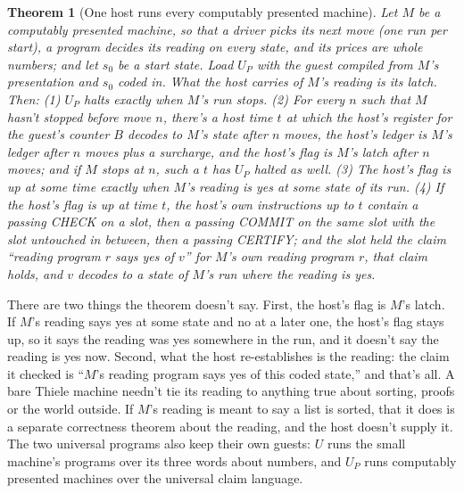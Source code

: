 \documentclass[11pt,twoside]{article}
\theoremstyle{thielethm}
\newtheorem{theorem}{Theorem}[section]
\theoremstyle{thieledef}
\theoremstyle{thieledef}
\theoremstyle{thieledef}
\theoremstyle{thielethm}
\theoremstyle{thieleobs}
\theoremstyle{thielethm}
\begin{document}
\begin{theorem}[One host runs every computably presented machine]\label{thm:u34-presented}
Let $M$ be a computably presented machine, so that a driver picks its next move (one run
per start), a program decides its reading on every state, and its prices are whole numbers; and let
$s_0$ be a start state. Load $U_P$ with the guest compiled from $M$'s presentation and $s_0$ coded
in. What the host carries of $M$'s reading is its latch. Then: (1) $U_P$ halts exactly when $M$'s run
stops. (2) For every $n$ such that $M$ hasn't stopped before move $n$, there's a host time $t$
at which the host's register for the guest's counter $B$ decodes to $M$'s state after $n$ moves,
the host's ledger is $M$'s ledger after $n$ moves plus a \emph{surcharge}, and the host's flag is
$M$'s latch after $n$ moves; and if $M$ stops at $n$, such a $t$ has $U_P$ halted as well. (3) The
host's flag is up at some time exactly when $M$'s reading is yes at some state of its run. (4) If
the host's flag is up at time $t$, the host's own instructions up to $t$ contain a passing CHECK on
a slot, then a passing COMMIT on the same slot with the slot untouched in between, then a
passing CERTIFY; and the slot held the claim ``reading program $r$ says yes of $v$''
for $M$'s own reading program $r$, that claim holds, and $v$ decodes to a state of $M$'s run where
the reading is yes.
\end{theorem}

There are two things the theorem doesn't say. First, the host's flag is $M$'s latch. If $M$'s reading says
yes at some state and no at a later one, the host's flag stays up, so it says the reading was yes
somewhere in the run, and it doesn't say the reading is yes now. Second, what the host
re-establishes is the reading: the claim it checked is ``$M$'s reading program says yes of this
coded state,'' and that's all. A bare Thiele machine needn't tie its reading to anything
true about sorting, proofs or the world outside. If $M$'s reading is meant to say a list is
sorted, that it does is a separate correctness theorem about the reading, and the host doesn't
supply it. The two universal programs also keep their own guests: $U$ runs the small machine's
programs over its three words about numbers, and $U_P$ runs computably presented machines over
the universal claim language.
\end{document}
